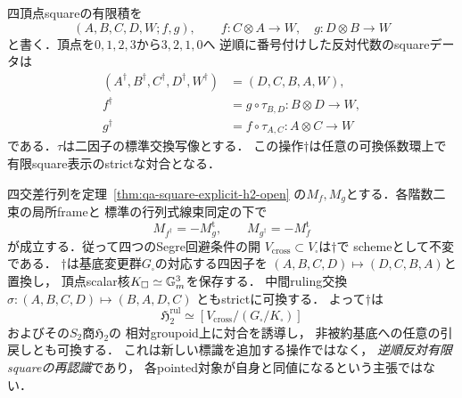 \begin{proposition}[全square表示の反対代数と四交差開の不変性]
\label{prop:qa-square-opposite-cross-involution}
四頂点squareの有限積を
\[
 (A,B,C,D,W;f,g),\qquad
 f:C\otimes A\to W,\quad g:D\otimes B\to W
\]
と書く．頂点を$0,1,2,3$から$3,2,1,0$へ
逆順に番号付けした反対代数のsquareデータは
\[
 \begin{split}
 (A^\dagger,B^\dagger,C^\dagger,D^\dagger,W^\dagger)
    &=(D,C,B,A,W),\\
 f^\dagger&=g\circ\tau_{B,D}:B\otimes D\to W,\\
 g^\dagger&=f\circ\tau_{A,C}:A\otimes C\to W
 \end{split}
 \tag{OS}\label{eq:qa-square-opposite-bundle-data}
\]
である．$\tau$は二因子の標準交換写像とする．
この操作$\dagger$は任意の可換係数環上で
有限square表示のstrictな対合となる．

四交差行列を定理~\ref{thm:qa-square-explicit-h2-open}
の$M_f,M_g$とする．各階数二束の局所frameと
標準の行列式線束同定の下で
\[
 M_{f^\dagger}=-M_g^{\mathrm t},\qquad
 M_{g^\dagger}=-M_f^{\mathrm t}
 \tag{OX}\label{eq:qa-square-opposite-cross-transpose}
\]
が成立する．従って四つのSegre回避条件の開
$V_{\mathrm{cross}}\subset V_\square$は$\dagger$で
schemeとして不変である．
$\dagger$は基底変更群$G_\square$の対応する四因子を
$(A,B,C,D)\mapsto(D,C,B,A)$と置換し，
頂点scalar核$K_\square\simeq\mathbb G_m^3$を保存する．
中間ruling交換$\sigma:(A,B,C,D)\mapsto(B,A,D,C)$
ともstrictに可換する．
よって$\dagger$は
\[
 \mathfrak H_2^{\mathrm{rul}}
  \simeq[V_{\mathrm{cross}}/(G_\square/K_\square)]
\]
およびその$S_2$商$\mathfrak H_2$の
相対groupoid上に対合を誘導し，
非被約基底への任意の引戻しとも可換する．
これは新しい標識を追加する操作ではなく，
\emph{逆順反対有限squareの再認識}であり，
各pointed対象が自身と同値になるという主張ではない．
\end{proposition}
